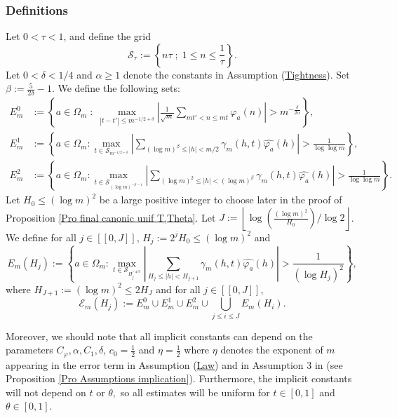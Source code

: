 \documentclass[12pt]{amsart}
\theoremstyle{definition}
\numberwithin{equation}{section}
\numberwithin{equation}{section}
\def\Ecal{\mathcal{E}}
\def\Scal{\mathcal{S}}
\def\Mp{C_\varphi}
\begin{document}
\subsubsection{Definitions}
Let \(0<\tau<1\), and define the grid
\[
\Scal_\tau := \left\{ n\tau \; ; \; 1\leq n \leq \frac{1}{\tau} \right\}.
\]
Let $0<\delta< 1/4 $ and $\alpha \geq 1 $ denote the constants in Assumption (\hyperlink{Ass Tightness}{Tightness}).
Set $\beta := \frac{5}{2\delta}-1$. We define the following sets:
\begin{align*}
E^0_m 
&:=\left\{a\in\Omega_m \;:\;
\max_{|t-t'|\leq m^{-1/2+\delta}}\left|
\frac{1}{\sqrt{m}}\sum_{mt' < n\leq mt} \varphi_a(n)
\right| >
m^{-\frac{\delta}{2\alpha}}
\right\},\\
E^1_m &:= \left\{ a \in  \Omega_m: \max _{t\in \Scal_{m^{-1/2+\delta}}} \left|\sum_{(\log m)^{\beta} \leq |h|< m/2} \gamma_m(h,t)\widehat{\varphi_a}(h)\right|> \frac{1}{\log\log m}\right\},\\
E^2_m &:= \left\{ a \in  \Omega_m: \max _{t\in \Scal_{(\log m)^{-\beta-1}}} \left|\sum_{(\log m)^2 \leq |h|<(\log m)^{\beta}} \gamma_m(h,t)\widehat{\varphi_a}(h)\right|> \frac{1}{\log\log m}\right\}.
\end{align*}
Let $H_0 \leq (\log m)^2$ be a large positive integer to choose later in the proof of Proposition \ref{Pro final canonic unif T,Theta}. Let $J:= \left\lfloor \log\left(\frac{(\log m)^2}{H_0}\right) /\log 2\right\rfloor$. We define for all $j \in [\![0,J]\!]  $, $H_j := 2^j H_0 \leq (\log m)^2$ and 
\[E_m(H_j) := 
\left\{ a \in  \Omega_m: \max _{t\in \Scal_{H_j^{-4/3}}} \left|\sum_{H_j\leq |h|< H_{j+1}} \gamma_m(h,t)\widehat{\varphi_a}(h)\right|> \frac{1}{(\log H_j)^2}\right\},
\]
where $H_{J+1}:= (\log m)^2 \leq 2 H_J$
and for all $j \in [\![0,J]\!]$,
\begin{equation}\label{eq def Ecal_m(H_j)}
\Ecal_m(H_j) := E^0_m\cup E^1_m\cup E^2_m\cup
\bigcup_{j \leq  i\leq J}
E_m(H_i).
\end{equation}


Moreover, we should note that all implicit constants can depend on the parameters $\Mp, \alpha, C_1,\delta$,
$c_0 = \frac{1}{2}$ and $\eta= \frac{1}{2}$ where \(\eta\) denotes the exponent of \(m\) appearing in the error term in Assumption (\hyperlink{Ass Law}{Law}) and in Assumption $3$ in \cite{ABL21} (see Proposition \ref{Pro Assumptions implication}). Furthermore, the implicit constants will not depend on $t$ or $\theta,$ so all estimates will be uniform for $t\in[0,1]$ and $\theta\in[0,1]$.
\end{document}
